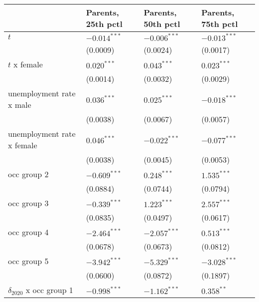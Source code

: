 \begin{tabular}{llll}
\toprule
{} & Parents, 25th pctl & Parents, 50th pctl & Parents, 75th pctl \\
\midrule
$t$                                    &     $-0.014^{***}$ &     $-0.006^{***}$ &     $-0.013^{***}$ \\
                                       &           (0.0009) &           (0.0024) &           (0.0017) \\
$t$ x female                           &      $0.020^{***}$ &      $0.043^{***}$ &      $0.023^{***}$ \\
                                       &           (0.0014) &           (0.0032) &           (0.0029) \\
unemployment rate x male               &      $0.036^{***}$ &      $0.025^{***}$ &     $-0.018^{***}$ \\
                                       &           (0.0038) &           (0.0067) &           (0.0057) \\
unemployment rate x female             &      $0.046^{***}$ &     $-0.022^{***}$ &     $-0.077^{***}$ \\
                                       &           (0.0038) &           (0.0045) &           (0.0053) \\
occ group 2                            &     $-0.609^{***}$ &      $0.248^{***}$ &      $1.535^{***}$ \\
                                       &           (0.0884) &           (0.0744) &           (0.0794) \\
occ group 3                            &     $-0.339^{***}$ &      $1.223^{***}$ &      $2.557^{***}$ \\
                                       &           (0.0835) &           (0.0497) &           (0.0617) \\
occ group 4                            &     $-2.464^{***}$ &     $-2.057^{***}$ &      $0.513^{***}$ \\
                                       &           (0.0678) &           (0.0673) &           (0.0812) \\
occ group 5                            &     $-3.942^{***}$ &     $-5.329^{***}$ &     $-3.028^{***}$ \\
                                       &           (0.0600) &           (0.0872) &           (0.1897) \\
$\delta_{2020}$ x occ group 1          &     $-0.998^{***}$ &     $-1.162^{***}$ &       $0.358^{**}$ \\

\end{tabular}
